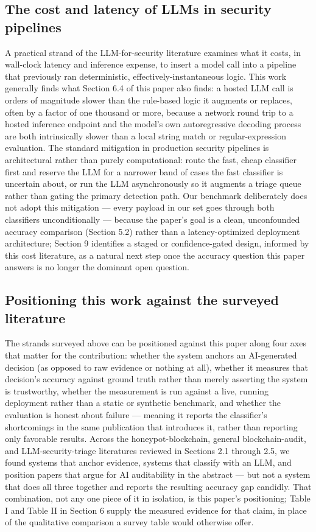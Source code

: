 \documentclass[journal,10pt,twocolumn]{IEEEtran}
\begin{document}
\subsection{The cost and latency of LLMs in security pipelines}

A practical strand of the LLM-for-security literature examines what it costs, in wall-clock latency and inference expense, to insert a model call into a pipeline that previously ran deterministic, effectively-instantaneous logic. This work generally finds what Section 6.4 of this paper also finds: a hosted LLM call is orders of magnitude slower than the rule-based logic it augments or replaces, often by a factor of one thousand or more, because a network round trip to a hosted inference endpoint and the model's own autoregressive decoding process are both intrinsically slower than a local string match or regular-expression evaluation. The standard mitigation in production security pipelines is architectural rather than purely computational: route the fast, cheap classifier first and reserve the LLM for a narrower band of cases the fast classifier is uncertain about, or run the LLM asynchronously so it augments a triage queue rather than gating the primary detection path. Our benchmark deliberately does not adopt this mitigation --- every payload in our set goes through both classifiers unconditionally --- because the paper's goal is a clean, unconfounded accuracy comparison (Section 5.2) rather than a latency-optimized deployment architecture; Section 9 identifies a staged or confidence-gated design, informed by this cost literature, as a natural next step once the accuracy question this paper answers is no longer the dominant open question.

\subsection{Positioning this work against the surveyed literature}

The strands surveyed above can be positioned against this paper along four axes that matter for the contribution: whether the system anchors an AI-generated decision (as opposed to raw evidence or nothing at all), whether it measures that decision's accuracy against ground truth rather than merely asserting the system is trustworthy, whether the measurement is run against a live, running deployment rather than a static or synthetic benchmark, and whether the evaluation is honest about failure --- meaning it reports the classifier's shortcomings in the same publication that introduces it, rather than reporting only favorable results. Across the honeypot-blockchain, general blockchain-audit, and LLM-security-triage literatures reviewed in Sections 2.1 through 2.5, we found systems that anchor evidence, systems that classify with an LLM, and position papers that argue for AI auditability in the abstract --- but not a system that does all three together and reports the resulting accuracy gap candidly. That combination, not any one piece of it in isolation, is this paper's positioning; Table I and Table II in Section 6 supply the measured evidence for that claim, in place of the qualitative comparison a survey table would otherwise offer.
\end{document}
